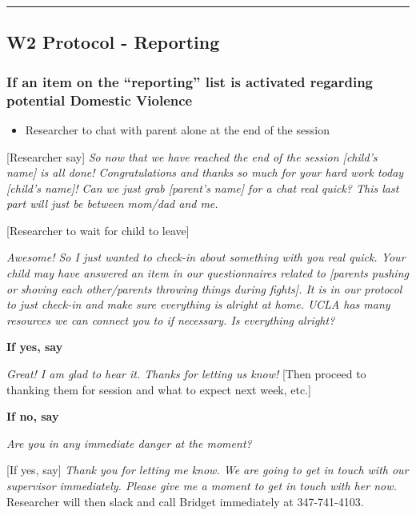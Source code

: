 \documentclass[
]{book}
\providecommand{\tightlist}{%
  \setlength{\itemsep}{0pt}\setlength{\parskip}{0pt}}
\begin{document}
\begin{center}\rule{0.5\linewidth}{0.5pt}\end{center}

\hypertarget{w2-protocol---reporting}{%
\subsection{W2 Protocol - Reporting}\label{w2-protocol---reporting}}

\hypertarget{if-an-item-on-the-reporting-list-is-activated-regarding-potential-domestic-violence-1}{%
\subsubsection{If an item on the ``reporting'' list is activated regarding potential Domestic Violence}\label{if-an-item-on-the-reporting-list-is-activated-regarding-potential-domestic-violence-1}}

\begin{itemize}
\tightlist
\item
  Researcher to chat with parent alone at the end of the session
\end{itemize}

{[}Researcher say{]} \emph{So now that we have reached the end of the session {[}child's name{]} is all done! Congratulations and thanks so much for your hard work today {[}child's name{]}! Can we just grab {[}parent's name{]} for a chat real quick? This last part will just be between mom/dad and me.}

{[}Researcher to wait for child to leave{]}

\emph{Awesome! So I just wanted to check-in about something with you real quick. Your child may have answered an item in our questionnaires related to {[}parents pushing or shoving each other/parents throwing things during fights{]}. It is in our protocol to just check-in and make sure everything is alright at home. UCLA has many resources we can connect you to if necessary. Is everything alright?}

\textbf{If yes, say}

\emph{Great! I am glad to hear it. Thanks for letting us know!} {[}Then proceed to thanking them for session and what to expect next week, etc.{]}

\textbf{If no, say}

\emph{Are you in any immediate danger at the moment?}

{[}If yes, say{]} \emph{Thank you for letting me know. We are going to get in touch with our supervisor immediately. Please give me a moment to get in touch with her now.} Researcher will then slack and call Bridget immediately at 347-741-4103.
\end{document}
